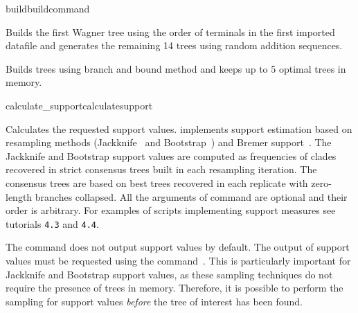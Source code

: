 \begin{command}{build}{buildcommand}
\begin{poyexamples}
            {Builds the first Wagner tree using the order of terminals in the first
            imported datafile and generates the remaining
            14 trees using random addition sequences.}
            
            {Builds trees using branch and bound method and keeps up to
            5 optimal trees in memory.}
            
	\end{poyexamples}

\end{command}

\begin{command}{calculate\_support}{calculatesupport}


	\begin{poydescription} 
            Calculates the requested support values. \poy implements support
            estimation based on resampling methods (Jackknife~\cite{Farrisetal1996} 
            and Bootstrap~\cite{Felsenstein1985}) and Bremer support~\cite{Bremer1988, Kallersjoetal1992}. 
            The Jackknife and Bootstrap support values are computed as
            frequencies of clades recovered in strict consensus trees built in each resampling
            iteration. The consensus trees are based on best trees recovered in each replicate
            with zero-length branches collapsed.
            All the arguments of  command are optional and
            their order is arbitrary.  For examples of scripts implementing support measures see 
            tutorials \texttt{4.3} and \texttt{4.4}. 
            
The  command does not output support values by default. The output of
            support values must be requested using the command~. 
            This is particularly important for
            Jackknife and Bootstrap support values, as these sampling techniques
            do not require the presence of trees in memory. Therefore, it is
            possible to perform the sampling for support values \emph{before}
            the tree of interest has been found.
            

\end{poydescription}
\end{command}
